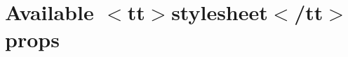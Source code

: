 \chapter{Available \texorpdfstring{$<$}{<}tt\texorpdfstring{$>$}{>}stylesheet\texorpdfstring{$<$}{<}/tt\texorpdfstring{$>$}{>} props}
\hypertarget{md_node__modules_2react-syntax-highlighter_2_a_v_a_i_l_a_b_l_e___s_t_y_l_e_s___h_l_j_s}{}\label{md_node__modules_2react-syntax-highlighter_2_a_v_a_i_l_a_b_l_e___s_t_y_l_e_s___h_l_j_s}
\label{md_node__modules_2react-syntax-highlighter_2_a_v_a_i_l_a_b_l_e___s_t_y_l_e_s___h_l_j_s_autotoc_md27168}%
%



